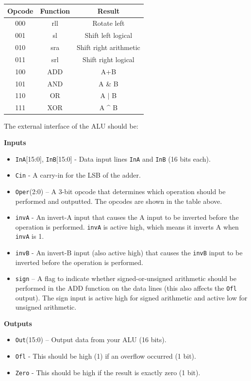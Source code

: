 \documentclass[12pt]{article}
\begin{document}
\begin{center}
\begin{tabular}{|c|c|c|} \hline 
Opcode & Function & Result \\ \hline
000 & rll & Rotate left \\ \hline
001 & sl & Shift left logical \\ \hline
010 & sra & Shift right arithmetic \\ \hline
011 & srl & Shift right logical \\ \hline
100 & ADD & A+B \\ \hline
101 & AND & A \& B \\ \hline
110 & OR & A $|$ B \\ \hline
111 & XOR & A \^{} B \\ \hline
\end{tabular}
\end{center}

The external interface of the ALU should be:

\textbf{Inputs}
\begin{itemize}
\item \texttt{InA}[15:0], \texttt{InB}[15:0] - Data input lines \texttt{InA} and \texttt{InB} (16 bits each).
\item \texttt{Cin} - A carry-in for the LSB of the adder.
\item \texttt{Oper}(2:0) – A 3-bit opcode that determines which operation should be performed and outputted.
The opcodes are shown in the table above.
\item \texttt{invA} - An invert-A input that causes the A input to be inverted before the operation is performed.
\texttt{invA} is active high, which means it inverts A when \texttt{invA} is 1.
\item \texttt{invB} - An invert-B input (also active high) that causes the \texttt{invB} input to be inverted before the
operation is performed.
\item \texttt{sign} – A flag to indicate whether signed-or-unsigned arithmetic should be performed in the ADD
function on the data lines (this also affects the \texttt{Ofl} output). The sign input is active high for signed
arithmetic and active low for unsigned arithmetic.
\end{itemize}

\textbf{Outputs}
\begin{itemize}
\item \texttt{Out}(15:0) – Output data from your ALU (16 bits).
\item \texttt{Ofl} - This should be high (1) if an overflow occurred (1 bit).
\item \texttt{Zero} - This should be high if the result is exactly zero (1 bit).
\end{itemize}
\end{document}
